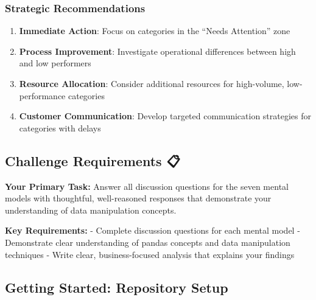 \documentclass[
  letterpaper,
  DIV=11,
  numbers=noendperiod]{scrartcl}
\providecommand{\tightlist}{%
  \setlength{\itemsep}{0pt}\setlength{\parskip}{0pt}}
\begin{document}
\subsubsection{Strategic
Recommendations}\label{strategic-recommendations}

\begin{enumerate}
\def\labelenumi{\arabic{enumi}.}
\tightlist
\item
  \textbf{Immediate Action}: Focus on categories in the ``Needs
  Attention'' zone
\item
  \textbf{Process Improvement}: Investigate operational differences
  between high and low performers
\item
  \textbf{Resource Allocation}: Consider additional resources for
  high-volume, low-performance categories
\item
  \textbf{Customer Communication}: Develop targeted communication
  strategies for categories with delays
\end{enumerate}

\subsection{Challenge Requirements 📋}\label{challenge-requirements}

\textbf{Your Primary Task:} Answer all discussion questions for the
seven mental models with thoughtful, well-reasoned responses that
demonstrate your understanding of data manipulation concepts.

\textbf{Key Requirements:} - Complete discussion questions for each
mental model - Demonstrate clear understanding of pandas concepts and
data manipulation techniques - Write clear, business-focused analysis
that explains your findings

\subsection{Getting Started: Repository Setup
🚀}\label{getting-started-repository-setup}
\end{document}
